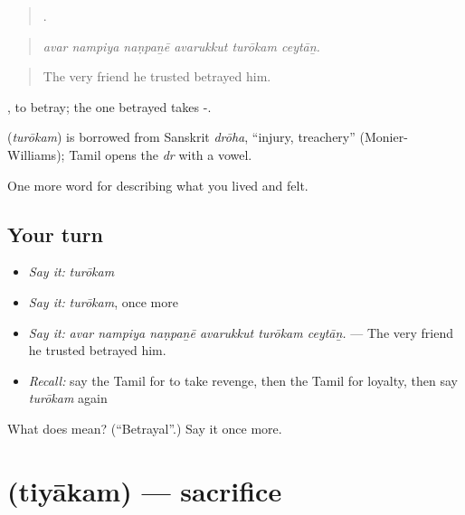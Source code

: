 \begin{quote}
     .
\end{quote}

\begin{quote}
\emph{avar nampiya naṇpaṉē avarukkut turōkam ceytāṉ.}
\end{quote}

\begin{quote}
The very friend he trusted betrayed him.
\end{quote}

 , to betray; the one betrayed takes -.

\begin{cousinweb}
\textbf{} (\emph{turōkam}) is borrowed from Sanskrit \emph{drōha}, \textquotedblleft{}injury, treachery\textquotedblright{} (Monier-Williams); Tamil opens the \emph{dr} with a vowel.
\end{cousinweb}

\begin{grammarlens}[title={What you've built}]
One more word for describing what you lived and felt.
\end{grammarlens}

\subsection*{Your turn}
\begin{itemize}
\raggedright
  \item \emph{Say it:} \emph{turōkam}
  \item \emph{Say it:} \emph{turōkam}, once more
  \item \emph{Say it:} \emph{avar nampiya naṇpaṉē avarukkut turōkam ceytāṉ.} — The very friend he trusted betrayed him.
  \item \emph{Recall:} say the Tamil for to take revenge, then the Tamil for loyalty, then say \emph{turōkam} again
\end{itemize}

\begin{tcolorbox}[breakable,colback=teal!4,colframe=teal!35!black,title={Before you move on}]
What does  mean? (\textquotedblleft{}Betrayal\textquotedblright{}.) Say it once more.
\end{tcolorbox}
\section[\texorpdfstring{\ta{தியாகம்} (tiyākam)}{தியாகம் (tiyākam)}]{ (tiyākam) — sacrifice}

